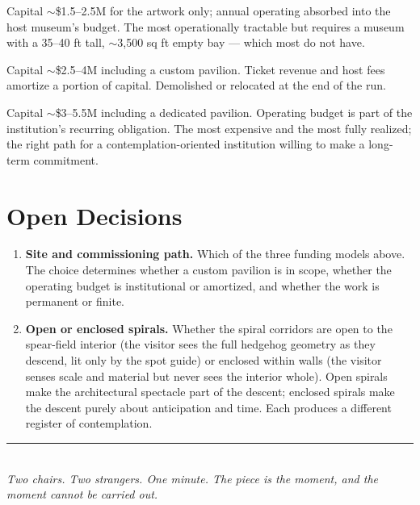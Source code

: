 \documentclass[10pt, letterpaper]{article}
\begin{document}
\begin{description}[style=nextline, leftmargin=0.6em, itemsep=0.4em]
  \item[Permanent museum commission, hosted in existing space.] Capital $\sim$\$1.5--2.5M for the artwork only; annual operating absorbed into the host museum's budget. The most operationally tractable but requires a museum with a 35--40 ft tall, $\sim$3{,}500 sq ft empty bay --- which most do not have.
  \item[Biennale or international exhibition (6--12 months).] Capital $\sim$\$2.5--4M including a custom pavilion. Ticket revenue and host fees amortize a portion of capital. Demolished or relocated at the end of the run.
  \item[Standalone institutional commission, permanent.] Capital $\sim$\$3--5.5M including a dedicated pavilion. Operating budget is part of the institution's recurring obligation. The most expensive and the most fully realized; the right path for a contemplation-oriented institution willing to make a long-term commitment.
\end{description}

\section{Open Decisions}

\begin{enumerate}
  \item \textbf{Site and commissioning path.} Which of the three funding models above. The choice determines whether a custom pavilion is in scope, whether the operating budget is institutional or amortized, and whether the work is permanent or finite.
  \item \textbf{Open or enclosed spirals.} Whether the spiral corridors are open to the spear-field interior (the visitor sees the full hedgehog geometry as they descend, lit only by the spot guide) or enclosed within walls (the visitor senses scale and material but never sees the interior whole). Open spirals make the architectural spectacle part of the descent; enclosed spirals make the descent purely about anticipation and time. Each produces a different register of contemplation.
\end{enumerate}

\vfill
{\color{rule}\rule{\textwidth}{1pt}}\\[0.2em]
{\footnotesize\itshape\color{muted}Two chairs. Two strangers. One minute. The piece is the moment, and the moment cannot be carried out.}
\end{document}

